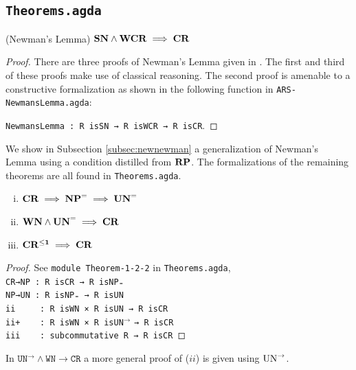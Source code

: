 
\subsection{\texttt{Theorems.agda}} \label{subsec:theorems}

\begin{theorem}(Newman's Lemma)
  $\mathbf{SN} \land \mathbf{WCR} \implies \mathbf{CR}$
\end{theorem}

\begin{proof}
  There are three proofs of Newman's Lemma given in \terese.
  The first and third of these proofs make use of classical reasoning. The second proof is amenable to a
  constructive formalization as shown in the following function in \texttt{ARS-NewmansLemma.agda}:

  \verb|NewmansLemma : R isSN → R isWCR → R isCR|.
\end{proof}

  We show in Subsection \ref{subsec:newnewman} a generalization of Newman's Lemma using a condition distilled from $\mathbf{RP}$.
  The formalizations of the remaining theorems are all found in \texttt{Theorems.agda}.

\begin{theorem} \hfill 
\begin{enumerate} [i)]%
  \item $\mathbf{CR} \implies \mathbf{NP}^{=} \implies \mathbf{UN}^{=}$
  \item $\mathbf{WN} \land \mathbf{UN}^{=} \implies \mathbf{CR}$
  \item $\mathbf{CR^{\le 1}} \implies \mathbf{CR}$
\end{enumerate}
\end{theorem}

\begin{proof}
    See \texttt{module Theorem-1-2-2} in \texttt{Theorems.agda}, \\
    \verb|CR→NP : R isCR → R isNP₌|\\
    \verb|NP→UN : R isNP₌ → R isUN|\\
    \verb|ii     : R isWN × R isUN → R isCR|\\
    \verb|ii+    : R isWN × R |\texttt{isUN}$^{\to}$ \verb|→ R isCR|\\
    \verb|iii    : subcommutative R → R isCR|
\end{proof}
\begin{remark}
    In $\mathtt{UN^{→}∧WN→CR}$ a more general proof of ($ii$) is given using $\mathrm{UN}^{\to}$.
\end{remark}


